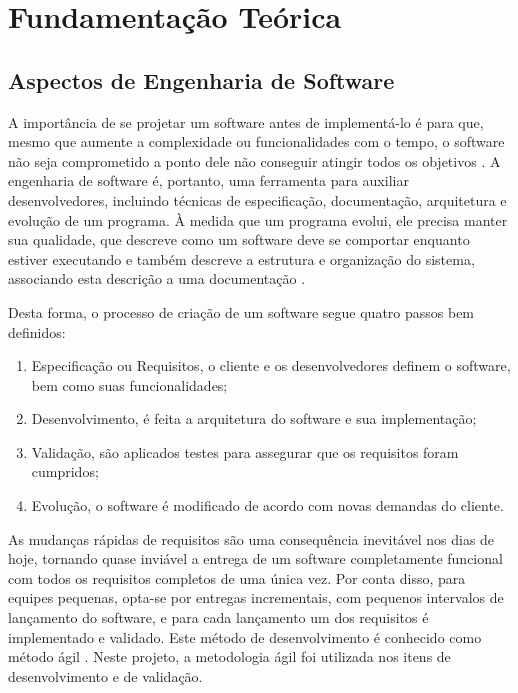 \section{Fundamentação Teórica}

\subsection{Aspectos de Engenharia de Software}

A importância de se projetar um software antes de implementá-lo é para que, mesmo que aumente a complexidade ou funcionalidades com o tempo, o software não seja comprometido a ponto dele não conseguir atingir todos os objetivos \cite{arqsoft}. A engenharia de software é, portanto, uma ferramenta para auxiliar desenvolvedores, incluindo técnicas de especificação, documentação, arquitetura e evolução de um programa. À medida que um programa evolui, ele precisa manter sua qualidade, que descreve como um software deve se comportar enquanto estiver executando e também descreve a estrutura e organização do sistema, associando esta descrição a uma documentação \cite{sommerville}.

Desta forma, o processo de criação de um software segue quatro passos bem definidos:
\begin{enumerate}

  \item Especificação ou Requisitos, o cliente e os desenvolvedores definem o software, bem como suas funcionalidades;
  \item Desenvolvimento, é feita a arquitetura do software e sua implementação;
  \item Validação, são aplicados testes para assegurar que os requisitos foram cumpridos;
  \item Evolução, o software é modificado de acordo com novas demandas do cliente.

\end{enumerate}

As mudanças rápidas de requisitos são uma consequência inevitável nos dias de hoje, tornando quase inviável a entrega de um software completamente funcional com todos os requisitos completos de uma única vez. Por conta disso, para equipes pequenas, opta-se por entregas incrementais, com pequenos intervalos de lançamento do software, e para cada lançamento um dos requisitos é implementado e validado. Este método de desenvolvimento é conhecido como método ágil \cite{sommerville}. Neste projeto, a metodologia ágil foi utilizada nos itens de desenvolvimento e de validação.

